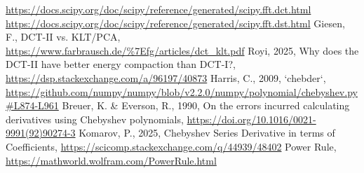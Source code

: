 \documentclass[10pt]{article}
\begin{document}
\begin{thebibliography}{99}
	\url{https://docs.scipy.org/doc/scipy/reference/generated/scipy.fft.dct.html}
	\url{https://docs.scipy.org/doc/scipy/reference/generated/scipy.fft.dst.html}
	Giesen, F., DCT-II vs. KLT/PCA, \url{https://www.farbrausch.de/%7Efg/articles/dct_klt.pdf}
	Royi, 2025, Why does the DCT-II have better energy compaction than DCT-I?, \url{https://dsp.stackexchange.com/a/96197/40873}
	Harris, C., 2009, `chebder`, \url{https://github.com/numpy/numpy/blob/v2.2.0/numpy/polynomial/chebyshev.py#L874-L961}
	Breuer, K. \& Everson, R., 1990, On the errors incurred calculating derivatives using Chebyshev polynomials, \url{https://doi.org/10.1016/0021-9991(92)90274-3}
	Komarov, P., 2025, Chebyshev Series Derivative in terms of Coefficients, \url{https://scicomp.stackexchange.com/q/44939/48402}
	Power Rule, \url{https://mathworld.wolfram.com/PowerRule.html}
\end{thebibliography}
\end{document}
